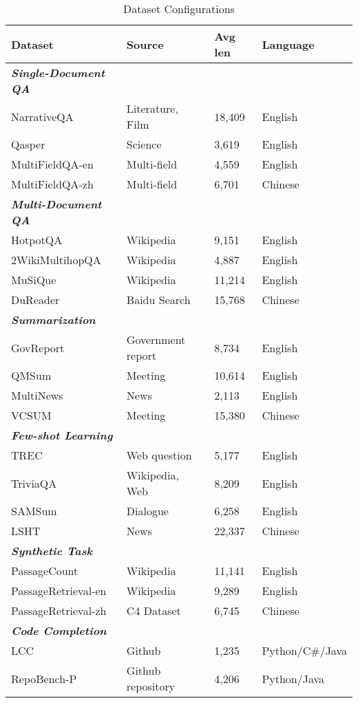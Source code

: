 \begin{table*}
  \centering
  \begin{tabular}{llll}
    \hline
    \textbf{Dataset} & \textbf{Source} & \textbf{Avg len} & \textbf{Language} \\
    \hline
    \textbf{\textit{Single-Document QA}} & & & \\
    NarrativeQA & Literature, Film & 18,409 & English \\
    Qasper & Science & 3,619 & English \\
    MultiFieldQA-en & Multi-field & 4,559 & English \\
    MultiFieldQA-zh & Multi-field & 6,701 & Chinese \\
    \hline
    \textbf{\textit {Multi-Document QA}} & & & \\
    HotpotQA & Wikipedia & 9,151 & English \\
    2WikiMultihopQA & Wikipedia & 4,887 & English \\
    MuSiQue & Wikipedia & 11,214 & English \\
    DuReader & Baidu Search & 15,768 & Chinese \\
    \hline
    \textbf{\textit{Summarization}} & & & \\
    GovReport & Government report & 8,734 & English \\
    QMSum & Meeting & 10,614 & English \\
    MultiNews & News & 2,113 & English \\
    VCSUM & Meeting & 15,380 & Chinese \\
    \hline
    \textbf{\textit{Few-shot Learning}} & & & \\
    TREC & Web question & 5,177 & English \\
    TriviaQA & Wikipedia, Web & 8,209 & English \\
    SAMSum & Dialogue & 6,258 & English \\
    LSHT & News & 22,337 & Chinese \\
    \hline
    \textbf{\textit{Synthetic Task}} & & & \\
    PassageCount & Wikipedia & 11,141 & English \\
    PassageRetrieval-en & Wikipedia & 9,289 & English \\
    PassageRetrieval-zh & C4 Dataset & 6,745 & Chinese \\
    \hline
    \textbf{\textit{Code Completion}} & & & \\
    LCC & Github & 1,235 & Python/C\#/Java \\
    RepoBench-P & Github repository & 4,206 & Python/Java \\
    \hline
  \end{tabular}
  \caption{Dataset Configurations}
  \label{tab:dataset}
\end{table*}